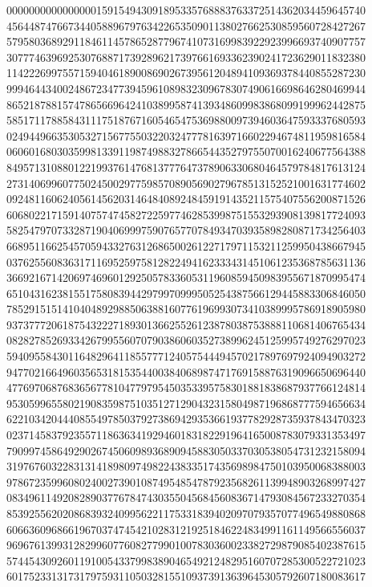 {{    0000000000000000159154943091895335768883763372514362034459645740 ~
    4564487476673440588967976342265350901138027662530859560728427267 ~
    5795803689291184611457865287796741073169983922923996693740907757 ~
    3077746396925307688717392896217397661693362390241723629011832380 ~
    1142226997557159404618900869026739561204894109369378440855287230 ~
    9994644340024867234773945961089832309678307490616698646280469944 ~
    8652187881574786566964241038995874139348609983868099199962442875 ~
    5851711788584311175187671605465475369880097394603647593337680593 ~
    0249449663530532715677550322032477781639716602294674811959816584 ~
    0606016803035998133911987498832786654435279755070016240677564388 ~
    8495713108801221993761476813777647378906330680464579784817613124 ~
    2731406996077502450029775985708905690279678513152521001631774602 ~
    0924811606240561456203146484089248459191435211575407556200871526 ~
    6068022171591407574745827225977462853998751553293908139817724093 ~
    5825479707332871904069997590765770784934703935898280871734256403 ~
    6689511662545705943327631268650026122717971153211259950438667945 ~
    0376255608363171169525975812822494162333431451061235368785631136 ~
    3669216714206974696012925057833605311960859450983955671870995474 ~
    6510431623815517580839442979970999505254387566129445883306846050 ~
    7852915151410404892988506388160776196993073410389995786918905980 ~
    9373777206187543222718930136625526123878038753888110681406765434 ~
    0828278526933426799556070790386060352738996245125995749276297023 ~
    5940955843011648296411855777124057544494570217897697924094903272 ~
    9477021664960356531815354400384068987471769158876319096650696440 ~
    4776970687683656778104779795450353395758301881838687937766124814 ~
    9530599655802190835987510351271290432315804987196868777594656634 ~
    6221034204440855497850379273869429353661937782928735937843470323 ~
    0237145837923557118636341929460183182291964165008783079331353497 ~
    7909974586492902674506098936890945883050337030538054731232158094 ~
    3197676032283131418980974982243833517435698984750103950068388003 ~
    9786723599608024002739010874954854787923568261139948903268997427 ~
    0834961149208289037767847430355045684560836714793084567233270354 ~
    8539255620208683932409956221175331839402097079357077496549880868 ~
    6066360968661967037474542102831219251846224834991161149566556037 ~
    9696761399312829960776082779901007830360023382729879085402387615 ~
    5744543092601191005433799838904654921248295160707285300522721023 ~
    6017523313173179759311050328155109373913639645305792607180083617 ~
}}
